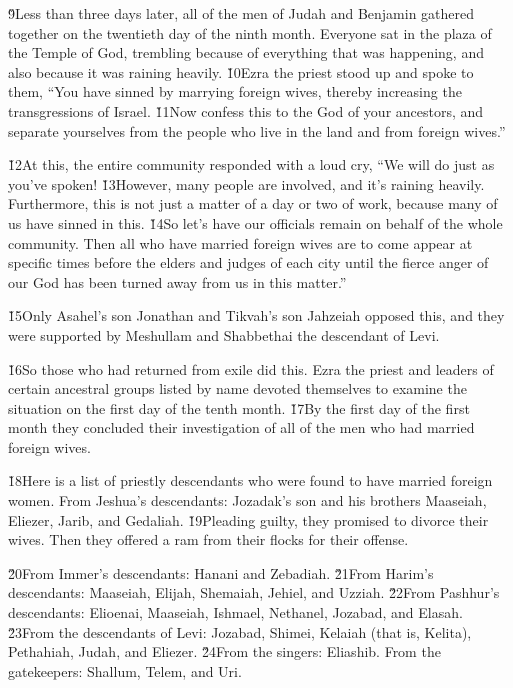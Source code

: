 \v{9}Less than three days later, all of the men of Judah and Benjamin gathered together on the twentieth day of the ninth month. Everyone sat in the plaza of the Temple of God, trembling because of everything that was happening, and also because it was raining heavily. \v{10}Ezra the priest stood up and spoke to them, ``You have sinned by marrying foreign wives, thereby increasing the transgressions of Israel. \v{11}Now confess this to the  God of your ancestors, and separate yourselves from the people who live in the land and from foreign wives.''

\v{12}At this, the entire community responded with a loud cry, ``We will do just as you've spoken! \v{13}However, many people are involved, and it's raining heavily. Furthermore, this is not just a matter of a day or two of work, because many of us have sinned in this. \v{14}So let's have our officials remain on behalf of the whole community. Then all who have married foreign wives are to come appear at specific times before the elders and judges of each city until the fierce anger of our God has been turned away from us in this matter.''

\v{15}Only Asahel's son Jonathan and Tikvah's son Jahzeiah opposed this, and they were supported by Meshullam and Shabbethai the descendant of Levi.

\v{16}So those who had returned from exile did this. Ezra the priest and leaders of certain ancestral groups listed by name devoted themselves to examine the situation on the first day of the tenth month. \v{17}By the first day of the first month they concluded their investigation of all of the men who had married foreign wives.

\v{18}Here is a list of priestly descendants who were found to have married foreign women. From Jeshua's descendants: Jozadak's son and his brothers Maaseiah, Eliezer, Jarib, and Gedaliah. \v{19}Pleading guilty, they promised to divorce their wives. Then they offered a ram from their flocks for their offense.

\v{20}From Immer's descendants: Hanani and Zebadiah. \v{21}From Harim's descendants: Maaseiah, Elijah, Shemaiah, Jehiel, and Uzziah. \v{22}From Pashhur's descendants: Elioenai, Maaseiah, Ishmael, Nethanel, Jozabad, and Elasah. \v{23}From the descendants of Levi: Jozabad, Shimei, Kelaiah (that is, Kelita), Pethahiah, Judah, and Eliezer. \v{24}From the singers: Eliashib. From the gatekeepers: Shallum, Telem, and Uri.

